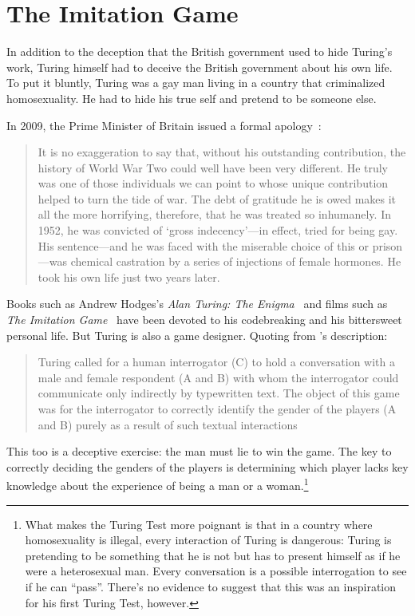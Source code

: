 \section{The Imitation Game}
\label{sec:turing:imitation}

In addition to the deception that the British government used to hide
Turing's work, Turing himself had to deceive the British government
about his own life.
%
To put it bluntly, Turing was a gay man living in a country that
criminalized homosexuality.
%
He had to hide his true self and pretend to be someone else.

In 2009, the Prime Minister of Britain issued a formal
apology~\citep{brown-09}:
\begin{quote}
It is no exaggeration to say that, without his outstanding contribution, 
the history of World War Two could well have been very different. 
He truly was one of those individuals we can point to whose unique 
contribution helped to turn the tide of war. 
%
The debt of gratitude he is owed makes it all the more horrifying, 
therefore, that he was treated so inhumanely. 
%
In 1952, he was convicted of `gross indecency'---in effect, tried for being gay. 
%
His sentence---and he was faced with the miserable choice of this or prison---was 
chemical castration by a series of injections of female hormones.
%
He took his own life just two years later.
\end{quote}

Books such as Andrew Hodges's \textit{Alan Turing: The Enigma}~\citep{hodges-83}
and films such as \textit{The Imitation Game}~\citep{tyldum-14} have been devoted
to his codebreaking and his bittersweet personal life.
%
But Turing is also a game designer.
%
Quoting from \citet{bishop-10-imitation-game}'s description:
\begin{quote}
  Turing called for a human interrogator (C) to hold a conversation
  with a male and female respondent (A and B) with whom the
  interrogator could communicate only indirectly by typewritten text.
  The object of this game was for the interrogator to correctly
  identify the gender of the players (A and B) purely as a result of
  such textual interactions
\end{quote}

This too is a deceptive exercise: the man must lie to win the game.
%
The key to correctly deciding the genders of the players is determining
which player lacks key knowledge about the experience of being a man or a
woman.\footnote{What makes the Turing Test more poignant is that in a
  country where homosexuality is illegal, every interaction of Turing is
  dangerous: Turing is pretending to be something that he is not but has
  to present himself as if he were a heterosexual
  man.  Every conversation is a possible interrogation to see if he can
  ``pass''.  There's no evidence to suggest that this was an
  inspiration for his first Turing Test, however.}

